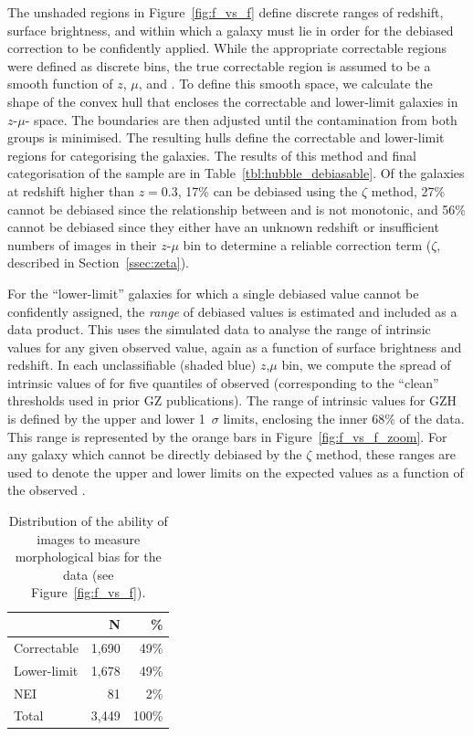 \documentclass[a4paper,fleqn,usenatbib]{mnras}
\begin{document}
The unshaded regions in Figure~\ref{fig:f_vs_f} define discrete ranges of redshift,
surface brightness, and \ffeatures{} within which a galaxy must lie in order for the
debiased correction to be confidently applied.
While the appropriate correctable regions were defined as discrete bins, the true
correctable region is assumed to be a smooth function of $z$, $\mu$, and
\ffeatures{}. To define this smooth space, we calculate the shape of the convex
hull that encloses the correctable and lower-limit \ferengi{} galaxies in
$z$-$\mu$-\ffeatures{} space. The boundaries are then adjusted until the
contamination from both groups is minimised. The resulting hulls define the
correctable and lower-limit regions for categorising the \hst{} galaxies. The
results of this method and final categorisation of the \hst{} sample are in
Table~\ref{tbl:hubble_debiasable}. Of the galaxies at redshift higher than
$z=0.3$, 17\% can be debiased using the $\zeta$ method, 27\% cannot be debiased
since the relationship between \ffeaturesz{} and \ffeaturesrest{} is not
monotonic, and 56\% cannot be debiased since they either have an unknown
redshift or insufficient numbers of \ferengi{} images in their $z$-$\mu$ bin
to determine a reliable correction term ($\zeta$, described in Section~\ref{ssec:zeta}).

For the ``lower-limit'' galaxies for which a single debiased \ffeatures{} value
cannot be confidently assigned, the \emph{range} of debiased values is
estimated and included as a data product. This uses the
\ferengi{} simulated data to analyse the range of intrinsic \ffeaturesrest{}
values for any given observed \ffeatures{} value, again as a function of
surface brightness and redshift. In each unclassifiable (shaded blue) $z$,$\mu$ bin, 
we compute the spread of
intrinsic values of \ffeaturesrest{} for five quantiles of observed \ffeatures{}
(corresponding to the ``clean'' thresholds used in prior GZ publications).
The range of intrinsic values for GZH is defined by the upper and lower 1~$\sigma$ limits,
enclosing the inner 68\% of the data. This range is represented by the orange bars in 
Figure~\ref{fig:f_vs_f_zoom}. For any galaxy which
cannot be directly debiased by the $\zeta$ method, these ranges are used to
denote the upper and lower limits on the expected values \ffeaturesrest{} as a
function of the observed \ffeatures. 

\begin{table}
\center
\caption{Distribution of the ability of images to measure
morphological bias for
the \ferengi{} data (see Figure~\ref{fig:f_vs_f}).}
\label{tbl:ferengi_corrections}
\begin{tabular}{lrr}
\hline \hline
                                   & N       & \% \\
\hline 
Correctable                        & 1,690   &  49\% \\
Lower-limit                        & 1,678   &  49\% \\
NEI                                & 81      &   2\%\\
Total                              & 3,449   & 100\% \\
\hline \hline
\end{tabular}
\end{table}
\end{document}
